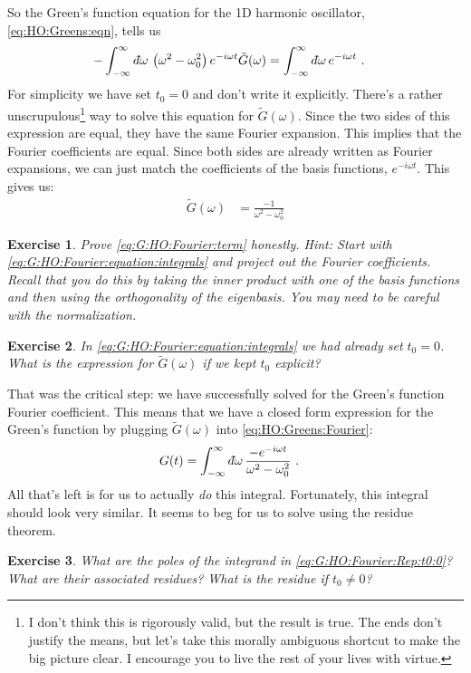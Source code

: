 \documentclass[
  11pt,
	colorful,
	raggedright,
]{tufte-style-thesis-flip}
\newtheorem{exercise}{Exercise}[section]
\renewcommand{\dbar}{d\hspace*{-0.08em}\bar{}\hspace*{0.1em}}
\begin{document}
So the Green's function equation for the 1D harmonic oscillator, \eqref{eq:HO:Greens:eqn}, tells us
\begin{align}
  -
  \int_{-\infty}^\infty \dbar \omega \, 
  \left(\omega^2-\omega_0^2\right) e^{-i\omega t} \tilde G(\omega)
  &=
  \int_{-\infty}^\infty \dbar \omega \, e^{-i\omega t}
  \ .
  \label{eq:G:HO:Fourier:equation:integrals}
\end{align}
For simplicity we have set $t_0=0$ and don't write it explicitly. There's a rather unscrupulous\footnote{I don't think this is rigorously valid, but the result is true. The ends don't justify the means, but let's take this morally ambiguous shortcut to make the big picture clear. I encourage you to live the rest of your lives with virtue.} way to solve this equation for $\tilde G(\omega)$. Since the two sides of this expression are equal, they have the same Fourier expansion. This implies that the Fourier coefficients are equal. Since both sides are already written as Fourier expansions, we can just match the coefficients of the basis functions, $e^{-i\omega t}$. This gives us:
\begin{align}
  \tilde G(\omega) &= \frac{-1}{\omega^2-\omega_0^2}
  \label{eq:G:HO:Fourier:term}
\end{align}
\begin{exercise}
Prove \eqref{eq:G:HO:Fourier:term} honestly. {Hint}: Start with \eqref{eq:G:HO:Fourier:equation:integrals} and project out the Fourier coefficients. Recall that you do this by taking the inner product with one of the basis functions and then using the orthogonality of the eigenbasis. You may need to be careful with the normalization.
\end{exercise}
\begin{exercise}
In \eqref{eq:G:HO:Fourier:equation:integrals} we had already set $t_0 = 0$. What is the expression for $\tilde G(\omega)$ if we kept $t_0$ explicit?
\label{eq:ex:Gtilde:with:t0:explicit}
\end{exercise}
That was the critical step: we have successfully solved for the Green's function Fourier coefficient. This means that we have a closed form expression for the Green's function by plugging $\tilde G(\omega)$ into \eqref{eq:HO:Greens:Fourier}:
\begin{align}
  G(t) &=  \int_{-\infty}^\infty \dbar \omega
  \, 
  \frac{-e^{-i\omega t}}{\omega^2-\omega_0^2} \ .
  \label{eq:G:HO:Fourier:Rep:t0:0}
\end{align}
All that's left is for us to actually \emph{do} this integral. Fortunately, this integral should look very similar. It seems to beg for us to solve using the residue theorem. 
\begin{exercise}
What are the poles of the integrand in \eqref{eq:G:HO:Fourier:Rep:t0:0}? What are their associated residues? What is the residue if $t_0\neq 0$?
\end{exercise}
\end{document}
